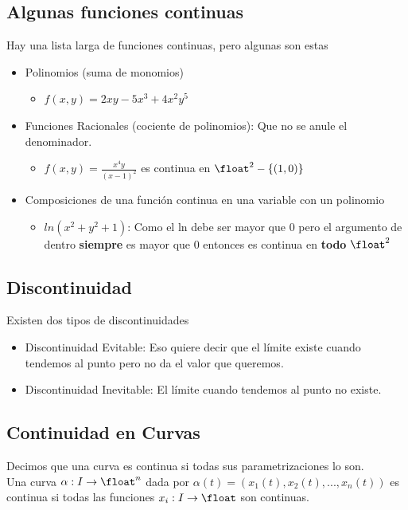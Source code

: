 \documentclass[10pt,a4paper]{article}
\begin{document}
\subsection*{Algunas funciones continuas}
Hay una lista larga de funciones continuas, pero algunas son estas 
\begin{itemize}
    \item Polinomios (suma de monomios)
    \begin{itemize}
        \item $f(x,y) = 2xy-5x^{3}+4x^{2}y^{5}$
    \end{itemize}
    \item Funciones Racionales (cociente de polinomios): Que no se anule el denominador.
    \begin{itemize}
        \item $f(x, y) = \frac{x^{4}y}{(x-1)^{2}}$ es continua en $\float^{2} - \{(1,0)\}$
    \end{itemize}
    \item Composiciones de una función continua en una variable con un polinomio 
    \begin{itemize}
        \item $ln(x^{2}+y^{2}+1)$: Como el ln debe ser mayor que 0 pero el argumento de dentro \textbf{siempre} es mayor que 0 entonces es continua en \textbf{todo} $\float^{2}$
    \end{itemize}
\end{itemize}
\subsection*{Discontinuidad}
Existen dos tipos de discontinuidades 
\begin{itemize}
    \item Discontinuidad Evitable: Eso quiere decir que el límite existe cuando tendemos al punto pero no da el valor que queremos.
    \item Discontinuidad Inevitable: El límite cuando tendemos al punto no existe.
\end{itemize}
\subsection*{Continuidad en Curvas}
Decimos que una curva es continua si todas sus parametrizaciones lo son. \\
Una curva $\alpha: I \rightarrow \float^{n}$ dada por $\alpha(t)=(x_{1}(t), x_{2}(t), ..., x_{n}(t))$ es continua si todas las funciones $x_{i}: I \rightarrow \float $ son continuas.
\end{document}
